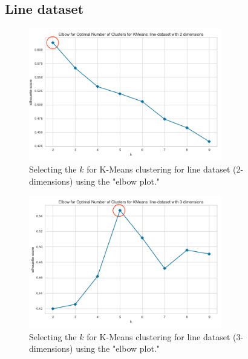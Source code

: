\subsection{Line dataset}
\begin{figure}[H]
  \includegraphics[width=0.75\textwidth]{Appendix//parameter-selection/line-dataset-2-kmeans.png}
  \caption{Selecting the $k$ for K-Means clustering for line dataset (2-dimensions) using the "elbow plot."}
  \label{hyperparameters:agglomerative-line-dataset-2d}
\end{figure}
\begin{figure}[H]
  \includegraphics[width=0.75\textwidth]{Appendix//parameter-selection/line-dataset-3-kmeans.png}
  \caption{Selecting the $k$ for K-Means clustering for line dataset (3-dimensions) using the "elbow plot."}
  \label{hyperparameters:agglomerative-line-dataset-3d}
\end{figure}
\newpage
